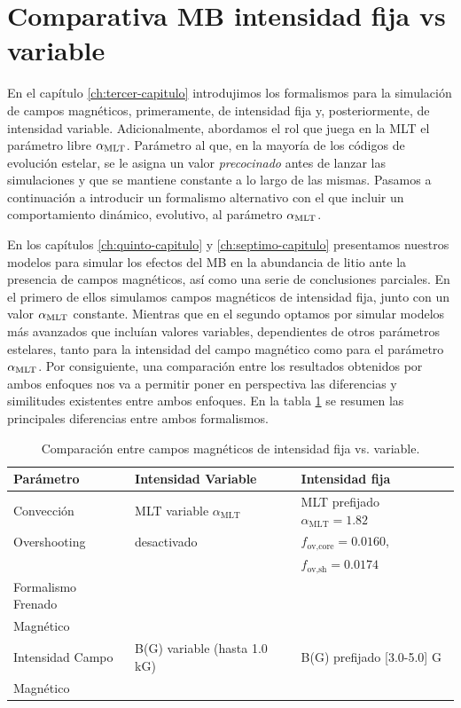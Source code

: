 \section{Comparativa MB intensidad fija vs variable}
En el capítulo \ref{ch:tercer-capitulo} introdujimos los formalismos para la simulación de campos magnéticos, primeramente, de intensidad fija y, posteriormente, de intensidad variable. Adicionalmente, abordamos el rol que juega en la MLT el parámetro libre $\alpha_{\mathrm{MLT}}$. Parámetro al que, en la mayoría de los códigos de evolución estelar, se le asigna un valor \textit{precocinado} antes de lanzar las simulaciones y que se mantiene constante a lo largo de las mismas. Pasamos a continuación a introducir un formalismo alternativo con el que incluir un comportamiento dinámico, evolutivo, al parámetro $\alpha_{\mathrm{MLT}}$.\par

En los capítulos \ref{ch:quinto-capitulo} y \ref{ch:septimo-capitulo} presentamos nuestros modelos para simular los efectos del MB en la abundancia de litio ante la presencia de campos magnéticos, así como una serie de conclusiones parciales. En el primero de ellos simulamos campos magnéticos de intensidad fija, junto con un valor $\alpha_{\mathrm{MLT}}$ constante. Mientras que en el segundo optamos por simular modelos más avanzados que incluían valores variables, dependientes de otros parámetros estelares, tanto para la intensidad del campo magnético como para el parámetro $\alpha_{\mathrm{MLT}}$. Por consiguiente, una comparación entre los resultados obtenidos por ambos enfoques nos va a permitir poner en perspectiva las diferencias y similitudes existentes entre ambos enfoques. En la tabla \ref{tab:caballero2023_2020} se resumen las principales diferencias entre ambos formalismos.\par 

\begin{table}
	\centering
	\begin{threeparttable}
		\begin{tabular}{lll} 
			\hline
			Parámetro & Intensidad Variable & Intensidad fija\\
			\hline
			Convección & MLT variable $\alpha_{\textrm{MLT}}$ & MLT prefijado $\alpha_{\textrm{MLT}}=1.82$\\
			Overshooting & desactivado & $f_{\textrm{ov,core}}=0.0160$,\\ & & $f_{\textrm{ov,sh}}=0.0174$\\
			Formalismo Frenado & \cite{Gallet2013} & \cite{Ud-Doula2008} \\ Magnético & & \\
			Intensidad Campo & B(G) variable (hasta 1.0 kG) & B(G) prefijado [3.0-5.0] G\\ Magnético & & \\
			\hline
		\end{tabular}
	\end{threeparttable}
	\caption{Comparación entre campos magnéticos de intensidad fija vs. variable.} \label{tab:caballero2023_2020}
\end{table}

